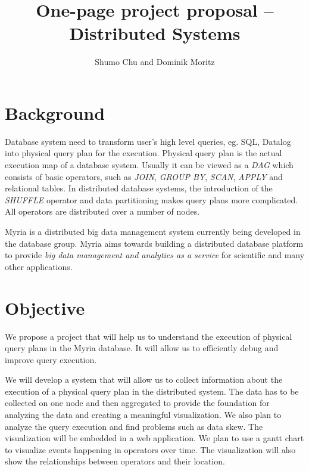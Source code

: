 \documentclass[12pt]{article}
\begin{document}

\title{One-page project proposal \--- Distributed Systems}
\author{Shumo Chu and Dominik Moritz}
\date{}

\maketitle

\section*{Background}

Database system need to transform user's high level queries, eg. SQL, Datalog into physical query plan for the execution. Physical query plan is the actual execution map of a database system. Usually it can be viewed as a \emph{DAG} which consists of basic operators, such as \emph{JOIN}, \emph{GROUP BY}, \emph{SCAN}, \emph{APPLY} and relational tables. In distributed database systems, the introduction of the \emph{SHUFFLE} operator and data partitioning makes query plans more complicated. All operators are distributed over a number of nodes.

Myria is a distributed big data management system currently being developed in the database group. Myria aims towards building a distributed database platform to provide \emph{big data management and analytics as a service} for scientific and many other applications.

\section*{Objective}

We propose a project that will help us to understand the execution of physical query plans in the Myria database. It will allow us to efficiently debug and improve query execution.

We will develop a system that will allow us to collect information about the execution of a physical query plan in the distributed system. The data has to be collected on one node and then aggregated to provide the foundation for analyzing the data and creating a meaningful visualization. We also plan to analyze the query execution and find problems such as data skew. The visualization will be embedded in a web application. We plan to use a gantt chart to visualize events happening in operators over time. The visualization will also show the relationships between operators and their location.
\end{document}
